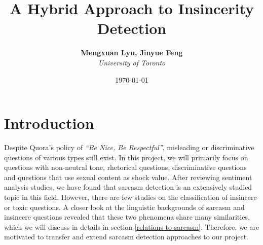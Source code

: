 \documentclass[12pt]{diazessay} %
\title{\textbf{A Hybrid Approach to Insincerity Detection}} %
\author{\textbf{Mengxuan Lyu, Jinyue Feng} \\ \textit{University of Toronto}} %
\date{\today} %
\begin{document}
\maketitle %






\doublespacing %

\section{Introduction}

Despite Quora's policy of \textit{``Be Nice, Be Respectful''}, misleading or discriminative questions of various types still exist. In this project, we will primarily focus on questions with non-neutral tone, rhetorical questions, discriminative questions and questions that use sexual content as shock value. After reviewing sentiment analysis studies, we have found that sarcasm detection is an extensively studied topic in this field. However, there are few studies on the classification of insincere or toxic questions. A closer look at the linguistic backgrounds of sarcasm and insincere questions revealed that these two phenomena share many similarities, which we will discuss in details in section \ref{relations-to-sarcasm}. Therefore, we are motivated to transfer and extend sarcasm detection approaches to our project. 
\end{document}

